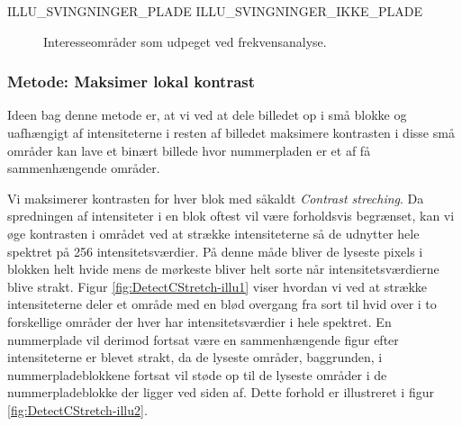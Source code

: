 ILLU\_SVINGNINGER\_PLADE
ILLU\_SVINGNINGER\_IKKE\_PLADE
\begin{figure}[htp]
  \centering
  \caption{Interesseområder som udpeget ved frekvensanalyse.}
  \label{fig:DetectPlateness-binary}
\end{figure}

\subsubsection{Metode: Maksimer lokal kontrast}
Ideen bag denne metode er, at vi ved at dele billedet op i små blokke og uafhængigt af intensiteterne i resten af billedet maksimere kontrasten i disse små områder kan lave et binært billede hvor nummerpladen er et af få sammenhængende områder.

Vi maksimerer kontrasten for hver blok med såkaldt \textit{Contrast streching}. Da spredningen af intensiteter i en blok oftest vil være forholdsvis begrænset, kan vi øge kontrasten i området ved at strække intensiteterne så de udnytter hele spektret på 256 intensitetsværdier. På denne måde bliver de lyseste pixels i blokken helt hvide  mens de mørkeste bliver helt sorte når intensitetsværdierne blive strakt. Figur \vref{fig:DetectCStretch-illu1} viser hvordan vi ved at strække intensiteterne deler et område med en blød overgang fra sort til hvid over i to forskellige områder der hver har intensitetsværdier i hele spektret. En nummerplade vil derimod fortsat være en sammenhængende figur efter intensiteterne er blevet strakt, da de lyseste områder, baggrunden, i nummerpladeblokkene fortsat vil støde op til de lyseste områder i de nummerpladeblokke der ligger ved siden af. Dette forhold er illustreret i figur \vref{fig:DetectCStretch-illu2}.


